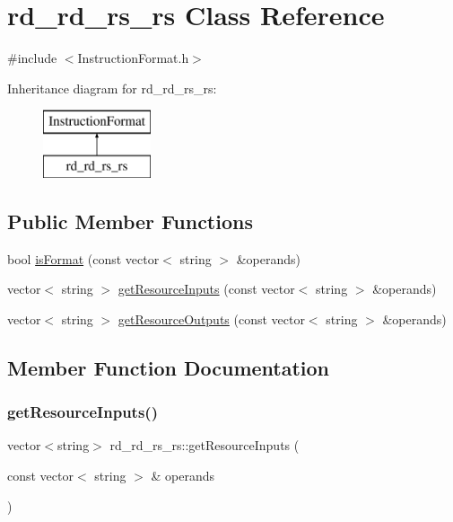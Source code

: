 \hypertarget{classrd__rd__rs__rs}{}\section{rd\+\_\+rd\+\_\+rs\+\_\+rs Class Reference}
\label{classrd__rd__rs__rs}


{\ttfamily \#include $<$Instruction\+Format.\+h$>$}

Inheritance diagram for rd\+\_\+rd\+\_\+rs\+\_\+rs\+:\begin{figure}[H]
\begin{center}
\leavevmode
\includegraphics[height=2.000000cm]{classrd__rd__rs__rs}
\end{center}
\end{figure}
\subsection*{Public Member Functions}
\begin{DoxyCompactItemize}
\item 
bool \hyperlink{classrd__rd__rs__rs_a66f9df0e42a4e8fd37d4182a22321602}{is\+Format} (const vector$<$ string $>$ \&operands)
\item 
vector$<$ string $>$ \hyperlink{classrd__rd__rs__rs_aa04311f97ba9aae16803046e190ecc1d}{get\+Resource\+Inputs} (const vector$<$ string $>$ \&operands)
\item 
vector$<$ string $>$ \hyperlink{classrd__rd__rs__rs_a7e666988b9c7ff5fb02074575311516c}{get\+Resource\+Outputs} (const vector$<$ string $>$ \&operands)
\end{DoxyCompactItemize}


\subsection{Member Function Documentation}
\mbox{\label{classrd__rd__rs__rs_aa04311f97ba9aae16803046e190ecc1d}} 
\subsubsection{\texorpdfstring{get\+Resource\+Inputs()}{getResourceInputs()}}
{\footnotesize\ttfamily vector$<$string$>$ rd\+\_\+rd\+\_\+rs\+\_\+rs\+::get\+Resource\+Inputs (\begin{DoxyParamCaption}\item[{const vector$<$ string $>$ \&}]{operands }\end{DoxyParamCaption})\hspace{0.3cm}{\ttfamily [virtual]}}

